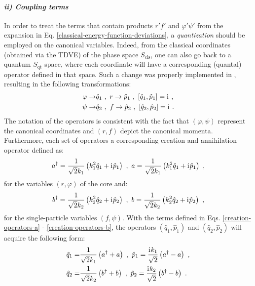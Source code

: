 \paragraph*{\textit{ii) Coupling terms}}
In order to treat the terms that contain products $r'f'$ and $\varphi'\psi'$ from the expansion in Eq. \ref{classical-energy-function-deviations}, a \emph{quantization} should be employed on the canonical variables. Indeed, from the classical coordinates (obtained via the TDVE) of the phase space $S_\text{cls}$, one can also go back to a quantum $S_\text{qt}$ space, where each coordinate will have a corresponding (quantal) operator defined in that space. Such a change was properly implemented in \cite{raduta2020approach}, resulting in the following transformations:
\begin{align}
    \varphi\to&\hat{q}_1\ ,\ r\to\hat{p}_1\ ,\ \left[\hat{q}_1,\hat{p}_1\right]=\iu\ ,\nonumber\\
    \psi\to&\hat{q}_2\ ,\ f\to\hat{p}_2\ ,\ \left[\hat{q}_2,\hat{p}_2\right]=\iu\ .
    \label{canonical-coordinates-quantized}
\end{align}
The notation of the operators is consistent with the fact that $(\varphi,\psi)$ represent the canonical coordinates and $(r,f)$ depict the canonical momenta. Furthermore, each set of operators a corresponding creation and annihilation operator defined as:
\begin{align}
    a^\dagger=\frac{1}{\sqrt{2}k_1}\left(k_1^2\hat{q}_1+ \mathrm{i}\mkern1mu \hat{p}_1\right)\ ,\ a=\frac{1}{\sqrt{2}k_1}\left(k_1^2\hat{q}_1+ \mathrm{i}\mkern1mu \hat{p}_1\right)\ ,
    \label{creation-operators-a}
\end{align}
for the variables $(r,\varphi)$ of the core and:
\begin{align}
    b^\dagger=\frac{1}{\sqrt{2}k_2}\left(k_2^2\hat{q}_2+ \mathrm{i}\mkern1mu \hat{p}_2\right)\ ,\ b=\frac{1}{\sqrt{2}k_2}\left(k_2^2\hat{q}_2+ \mathrm{i}\mkern1mu \hat{p}_2\right)\ ,
    \label{creation-operators-b}
\end{align}
for the single-particle variables $(f,\psi)$. With the terms defined in Eqs. \ref{creation-operators-a} - \ref{creation-operators-b}, the operators $(\hat{q}_1,\hat{p}_1)$ and $(\hat{q}_2,\hat{p}_2)$ will acquire the following form:
\begin{align}
    \hat{q}_1=&\frac{1}{\sqrt{2}k_1}\left(a^\dagger+a\right)\ ,\ \hat{p}_1=\frac{\iu k_1}{\sqrt{2}}\left(a^\dagger-a\right)\ ,\nonumber\\
    \hat{q}_2=&\frac{1}{\sqrt{2}k_2}\left(b^\dagger+b\right)\ ,\ \hat{p}_2=\frac{\iu k_2}{\sqrt{2}}\left(b^\dagger-b\right)\ .
    \label{canonical-transformations-ab-qp}
\end{align}

